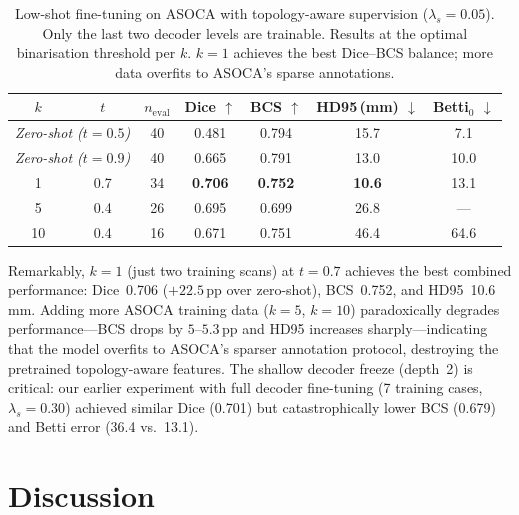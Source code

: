 \documentclass[runningheads]{llncs}
\begin{document}
\begin{table}[t]
\caption{Low-shot fine-tuning on ASOCA with topology-aware supervision ($\lambda_s{=}0.05$). Only the last two decoder levels are trainable. Results at the optimal binarisation threshold per $k$. $k{=}1$ achieves the best Dice--BCS balance; more data overfits to ASOCA's sparse annotations.}
\label{tab:lowshot}
\centering
\small
\begin{tabular}{ccccccc}
\toprule
$k$ & $t$ & $n_{\mathrm{eval}}$ & Dice $\uparrow$ & BCS $\uparrow$ & HD95\,(mm) $\downarrow$ & Betti$_0$ $\downarrow$ \\
\midrule
\multicolumn{2}{l}{\textit{Zero-shot ($t{=}0.5$)}} & 40 & 0.481 & 0.794 & 15.7 & 7.1 \\
\multicolumn{2}{l}{\textit{Zero-shot ($t{=}0.9$)}} & 40 & 0.665 & 0.791 & 13.0 & 10.0 \\
\midrule
1  & 0.7 & 34 & \textbf{0.706} & \textbf{0.752} & \textbf{10.6} & 13.1 \\
5  & 0.4 & 26 & 0.695 & 0.699 & 26.8 & --- \\
10 & 0.4 & 16 & 0.671 & 0.751 & 46.4 & 64.6 \\
\bottomrule
\end{tabular}
\end{table}

Remarkably, $k{=}1$ (just two training scans) at $t{=}0.7$ achieves the best combined performance: Dice~0.706 ($+22.5$\,pp over zero-shot), BCS~0.752, and HD95~10.6\,mm.
Adding more ASOCA training data ($k{=}5$, $k{=}10$) paradoxically degrades performance---BCS drops by $5$--$5.3$\,pp and HD95 increases sharply---indicating that the model overfits to ASOCA's sparser annotation protocol, destroying the pretrained topology-aware features.
The shallow decoder freeze (depth~2) is critical: our earlier experiment with full decoder fine-tuning (7 training cases, $\lambda_s{=}0.30$) achieved similar Dice (0.701) but catastrophically lower BCS (0.679) and Betti error (36.4 vs.\ 13.1).

\section{Discussion}
\end{document}
